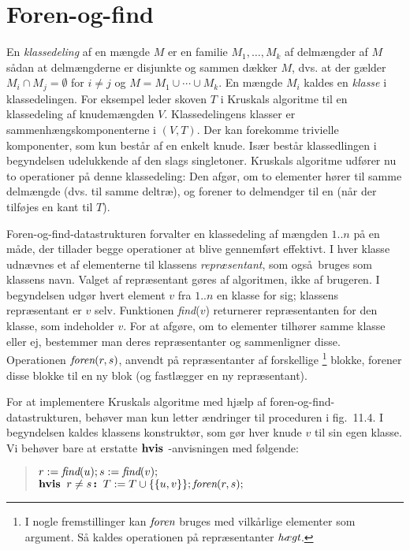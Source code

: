 \section{Foren-og-find}

En \emph{klassedeling} af en mængde $M$ er en familie $M_1,\ldots, M_k$ af delmængder af $M$ sådan at delmængderne er disjunkte og sammen dækker $M$, dvs. at der gælder $M_i\cap M_j=\emptyset$ for $i\neq j$ og $M=M_1\cup \cdots\cup M_k$. 
En mængde $M_i$ kaldes en \emph{klasse} i klassedelingen.
For eksempel leder skoven $T$ i Kruskals algoritme til en klassedeling af knudemængden $V$.
Klassedelingens klasser er sammenhængskomponenterne i $(V,T)$.
Der kan forekomme trivielle komponenter, som kun består af en enkelt knude.
Især består klassedlingen i begyndelsen udelukkende af den slags singletoner.
Kruskals algoritme udfører nu to operationer på denne klassedeling:
Den afgør, om to elementer hører til samme delmængde (dvs. til samme deltræ), og forener to delmendger til en (når der tilføjes en kant til $T$).

Foren-og-find-datastrukturen forvalter en klassedeling af mængden $1..n$ på en måde, der tillader begge operationer at blive gennemført effektivt.
I hver klasse udnævnes et af elementerne til klassens \emph{repræsentant}, som også bruges som klassens navn.
Valget af repræsentant gøres af algoritmen, ikke af brugeren.
I begyndelsen udgør hvert element $v$ fra $1..n$ en klasse for sig;
klassens repræsentant er $v$ selv.
Funktionen \emph{find}($v$) returnerer repræsentanten for den klasse, som indeholder $v$.
For at afgøre, om to elementer tilhører samme klasse eller ej, bestemmer man deres repræsentanter og sammenligner disse.
Operationen $\operatorname{\emph{foren}}(r,s)$, anvendt på repræsentanter af forskellige%
\footnote{I nogle fremstillinger kan $\operatorname{\emph{foren}}$ bruges med vilkårlige elementer som argument.
Så kaldes operationen på repræsentanter $\operatorname{\emph{hægt}}$.
}
blokke, forener disse blokke til en ny blok (og fastlægger en ny repræsentant).

For at implementere Kruskals algoritme med hjælp af foren-og-find-datastrukturen, behøver man kun letter ændringer til proceduren i fig.~11.4.
I begyndelsen kaldes klassens konstruktør, som gør hver knude $v$ til sin egen klasse.
Vi behøver bare at erstatte $\operatorname{\textbf{hvis~}}$-anvisningen med følgende:

\begin{quote}
\begin{tabbing}
  $r := \operatorname{\emph{find}}(u); s := \operatorname{\emph{find}}(v);$\\
  $\operatorname{\textbf{hvis~}} r\neq s \operatorname{\textbf{:~}} T:= T\cup \{\{u,v\}\}; \operatorname{\emph{foren}}(r,s);$
\end{tabbing}
\end{quote}

